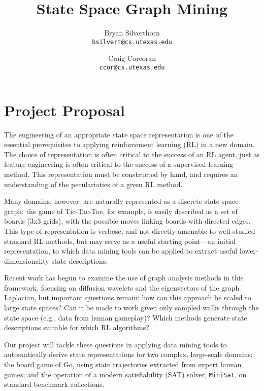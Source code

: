 \documentclass{article}
\title{State Space Graph Mining}
\author{Bryan Silverthorn\\
\texttt{bsilvert@cs.utexas.edu}
\and Craig Corcoran\\
\texttt{ccor@cs.utexas.edu}}
\begin{document}
\maketitle

%
%

\section*{Project Proposal}

The engineering of an appropriate state space representation is one of the
essential prerequisites to applying reinforcement learning (RL) in a new
domain. The choice of representation is often critical to the success of an RL
agent, just as feature engineering is often critical to the success of a
supervised learning method. This representation must be constructed by hand,
and requires an understanding of the peculariaties of a given RL method.

Many domains, however, are naturally represented as a discrete state space
graph: the game of Tic-Tac-Toe, for example, is easily described as a set of
boards (3x3 grids), with the possible moves linking boards with directed edges.
This type of representation is verbose, and not directly amenable to
well-studied standard RL methods, but may serve as a useful starting point---an
initial representation, to which data mining tools can be applied to extract
useful lower-dimensionality state descriptions.

Recent work \citep{Wang2009Multiscale,Mahadevan2006Value} has begun to examine
the use of graph analysis methods in this framework, focusing on diffusion
wavelets and the eigenvectors of the graph Laplacian, but important questions
remain: how can this approach be scaled to large state spaces? Can it be made
to work given only sampled walks through the state space (e.g., data from human
gameplay)? Which methods generate state descriptions suitable for which RL
algorithms?

Our project will tackle these questions in applying data mining tools to
automatically derive state representations for two complex, large-scale
domains: the board game of Go, using state trajectories extracted from expert
human games; and the operation of a modern satisfiability (SAT) solver,
\texttt{MiniSat}, on standard benchmark collections.

%
%



\end{document}
